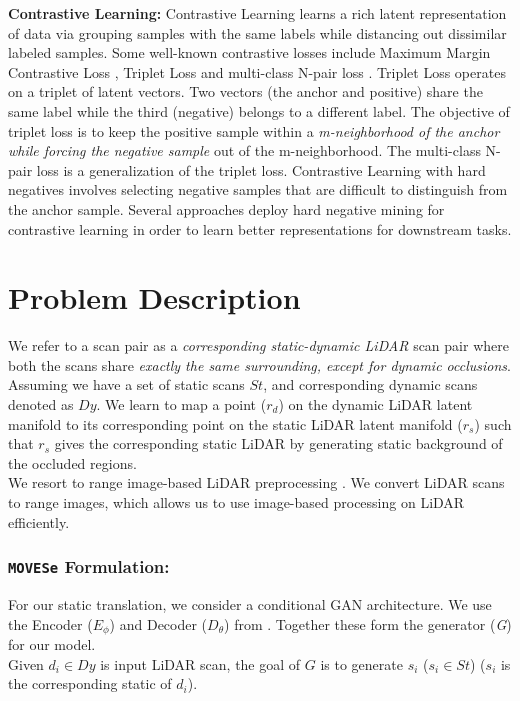 \documentclass[10pt,twocolumn,letterpaper]{article}
\newcommand{\dslr}{\texttt{\textbf{MOVESe}}}
\begin{document}
\textbf{Contrastive Learning:}
Contrastive Learning learns a rich latent representation of data via grouping samples with the same labels while distancing out dissimilar labeled samples.
Some well-known contrastive losses include Maximum Margin Contrastive Loss \cite{hadsell2006dimensionality}, Triplet Loss \cite{weinberger2009distance} and multi-class N-pair loss \cite{sohn2016improved}.
Triplet Loss \cite{weinberger2009distance} operates on a triplet of latent vectors. Two vectors (the anchor and positive) share the same label while the third (negative) belongs to a different label. The objective of triplet loss is to keep the positive sample within a \textit{m-neighborhood of the anchor while forcing the negative sample} out of the m-neighborhood. 
The multi-class N-pair loss  is a generalization of the triplet loss.
Contrastive Learning with hard negatives \cite{robinson2020contrastive} involves selecting negative samples that are difficult to distinguish from the anchor sample. Several approaches \cite{cao2020parametric,chuang2020debiased,iscen2018mining,wu2020mutual,xie2022delving,ho2020contrastive} deploy hard negative mining for contrastive learning in order to learn better representations for downstream tasks.

\section{Problem Description}
We refer to a scan pair as a \textit{corresponding static-dynamic LiDAR} scan pair where both the scans share \textit{exactly the same surrounding, except for dynamic occlusions}. Assuming we have a set of static scans $St$, and corresponding dynamic scans denoted as $Dy$.
We learn to map a point ($r_d$) on the dynamic LiDAR latent manifold to its corresponding point on the static LiDAR latent manifold ($r_s$) such that $r_s$ gives the corresponding static LiDAR by generating static background of the occluded regions.\\ 
  We resort to range image-based LiDAR preprocessing \cite{caccia2018deep}. We convert LiDAR scans to range images, which allows us to use image-based processing on LiDAR efficiently.

\subsubsection{\dslr{} Formulation:}
For our static translation, we consider a conditional GAN architecture. We use the Encoder ($E_\phi$) and Decoder ($D_\theta$) from \cite{caccia2018deep}. Together these form the generator (\textit{G}) for our model.\\ Given $d_i\in Dy$ is input LiDAR scan, the goal of $G$ is to generate $s_i$ ($s_i \in St$) (${s_i}$ is the corresponding static of $d_i$). 
\\
\end{document}
